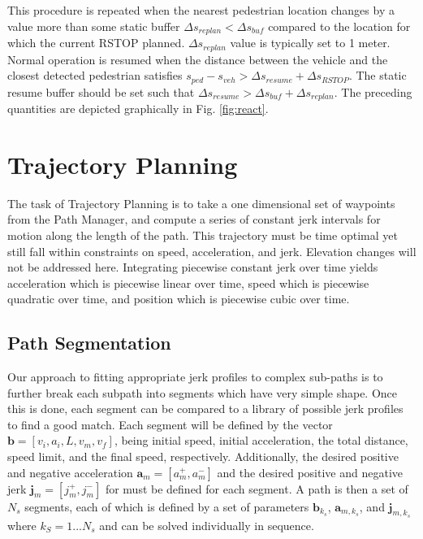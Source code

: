 \documentclass[letterpaper, 10 pt, conference]{ieeeconf}  %
\begin{document}
This procedure is repeated when the nearest pedestrian location changes by a value more than some static buffer $\Delta s_{replan} < \Delta s_{buf}$ compared to the location for which the current RSTOP planned.
$\Delta s_{replan}$ value is typically set to 1 meter.
Normal operation is resumed when the distance between the vehicle and the closest detected pedestrian satisfies $s_{ped} - s_{veh} > \Delta s_{resume} + \Delta s_{RSTOP}$. The static resume buffer should be set such that $\Delta s_{resume} > \Delta s_{buf} + \Delta s_{replan}$.
The preceding quantities are depicted graphically in Fig. \ref{fig:react}.


\section{Trajectory Planning} \label{sec:trajectoryplanning}

The task of Trajectory Planning is to take a one dimensional set of waypoints from the Path Manager, and compute a series of constant jerk intervals for motion along the length of the path.
This trajectory must be time optimal yet still fall within constraints on speed, acceleration, and jerk.
Elevation changes will not be addressed here.
Integrating piecewise constant jerk over time yields acceleration which is piecewise linear over time, speed which is piecewise quadratic over time, and position which is piecewise cubic over time.


\subsection{Path Segmentation} \label{sec:pathsegmentation}

Our approach to fitting appropriate jerk profiles to complex sub-paths is to further break each subpath into segments which have very simple shape.
Once this is done, each segment can be compared to a library of possible jerk profiles to find a good match.
Each segment will be defined by the vector $\mathbf{b}  = [v_i, a_i, L, v_m, v_f]$, being initial speed, initial acceleration, the total distance, speed limit, and the final speed, respectively.
Additionally, the desired positive and negative acceleration $\mathbf{a}_m = [a^+_m , a^-_m]$ and the desired positive and negative jerk $\mathbf{j}_m = [j^+_m , j^-_m]$ for must be defined for each segment.
A path is then a set of $N_s$ segments, each of which is defined by a set of parameters $\mathbf{b}_{k_s}$, $\mathbf{a}_{m,k_s}$, and $\mathbf{j}_{m,k_s}$ where $k_S = 1 ... N_s$ and can be solved individually in sequence.
\end{document}
